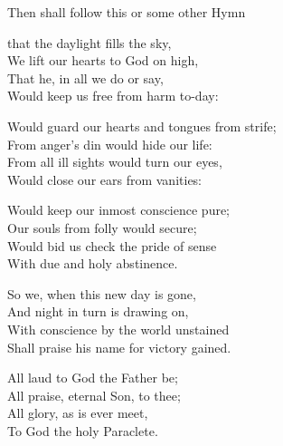 

\begin{rubric}
Then shall follow this or some other Hymn
\end{rubric}

 that the daylight fills the sky,\\
We lift our hearts to God on high,\\
That he, in all we do or say,\\
Would keep us free from harm to-day:

Would guard our hearts and tongues from strife;\\
From anger's din would hide our life:\\
From all ill sights would turn our eyes,\\
Would close our ears from vanities:

Would keep our inmost conscience pure;\\
Our souls from folly would secure;\\
Would bid us check the pride of sense\\
With due and holy abstinence.

So we, when this new day is gone,\\
And night in turn is drawing on,\\
With conscience by the world unstained\\
Shall praise his name for victory gained.

All laud to God the Father be;\\
All praise, eternal Son, to thee;\\
All glory, as is ever meet,\\
To God the holy Paraclete.

